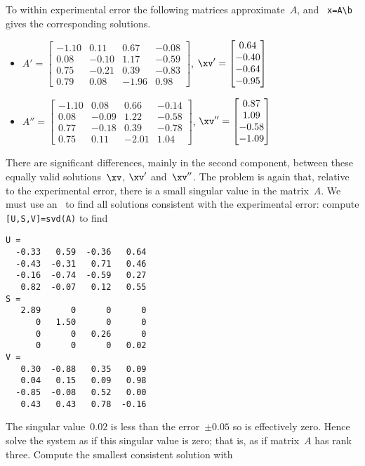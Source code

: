 \begin{reduce}
\begin{example}
\begin{solution}
To within experimental error the following matrices approximate~\(A\), and \script\ \verb|x=A\b| gives the corresponding solutions.
\begin{itemize}\small
\item \(A'=\begin{bmatrix} -1.10&0.11&0.67&-0.08
\\0.08&-0.10&1.17&-0.59
\\0.75&-0.21&0.39&-0.83
\\0.79&0.08&-1.96&0.98 \end{bmatrix}\),
\(\xv'=\begin{bmatrix} 0.64
\\-0.40
\\-0.64
\\-0.95 \end{bmatrix}\)
\item \(A''=\begin{bmatrix} -1.10&0.08&0.66&-0.14
\\0.08&-0.09&1.22&-0.58
\\0.77&-0.18&0.39&-0.78
\\0.75&0.11&-2.01&1.04 \end{bmatrix}\),
\(\xv''=\begin{bmatrix} 0.87
\\1.09
\\-0.58
\\-1.09 \end{bmatrix}\)
\end{itemize}
There are significant differences, mainly in the second component, between these equally valid solutions~\(\xv\), \(\xv'\) and~\(\xv''\).
The problem is again that, relative to the experimental error, there is a small singular value in the matrix~\(A\).
We must use an \svd\ to find all solutions consistent with the experimental error: compute \verb|[U,S,V]=svd(A)| to find~\twodp
\begin{verbatim}
U =
  -0.33   0.59  -0.36   0.64
  -0.43  -0.31   0.71   0.46
  -0.16  -0.74  -0.59   0.27
   0.82  -0.07   0.12   0.55
S =
   2.89      0      0      0
      0   1.50      0      0
      0      0   0.26      0
      0      0      0   0.02
V =
   0.30  -0.88   0.35   0.09
   0.04   0.15   0.09   0.98
  -0.85  -0.08   0.52   0.00
   0.43   0.43   0.78  -0.16
\end{verbatim}
The singular value~\(0.02\) is less than the error~\(\pm0.05\) so is effectively zero.
Hence solve the system as if this singular value is zero; that is, as if matrix~\(A\) has rank three.
Compute the smallest consistent solution with 

\end{solution}
\end{example}
\end{reduce}
